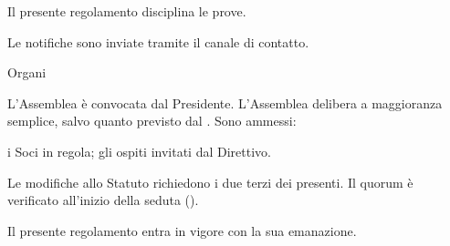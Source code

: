 
Il presente regolamento disciplina le prove.

Le notifiche sono inviate tramite il canale di contatto.

\begin{capo}[id=cap001]{Organi}

\begin{commi}
  \comma[id=com001] L'Assemblea è convocata dal Presidente.
  \comma[id=com002] L'Assemblea delibera a maggioranza semplice, salvo quanto previsto dal .
  \comma[id=com003] Sono ammessi:
  \begin{lettere}
     i Soci in regola;
     gli ospiti invitati dal Direttivo.
  \end{lettere}
\end{commi}

\begin{commi}
  \comma[id=com004] Le modifiche allo Statuto richiedono i due terzi dei presenti.
  \comma[id=com005] Il quorum è verificato all'inizio della seduta ().
\end{commi}

\end{capo}

Il presente regolamento entra in vigore con la sua emanazione.

